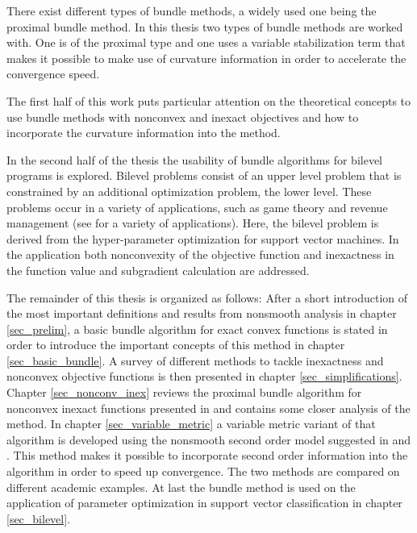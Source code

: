 There exist different types of bundle methods, a widely used one being the proximal bundle method.
In this thesis two types of bundle methods are worked with. One is of the proximal type and one uses a variable stabilization term that makes it possible to make use of curvature information in order to accelerate the convergence speed.

The first half of this work puts particular attention on the theoretical concepts to use bundle methods with nonconvex and inexact objectives and how to incorporate the curvature information into the method.

In the second half of the thesis the usability of bundle algorithms for bilevel programs is explored. Bilevel problems consist of an upper level problem that is constrained by an additional optimization problem, the lower level.
These problems occur in a variety of applications, such as game theory and revenue management (see \cite[section 2.1]{Colson2007} for a variety of applications).
Here, the bilevel problem is derived from the hyper-parameter optimization for support vector machines. 
In the application both nonconvexity of the objective function and inexactness in the function value and subgradient calculation are addressed.

The remainder of this thesis is organized as follows:
After a short introduction of the most important definitions and results from nonsmooth analysis in chapter \ref{sec_prelim}, a basic bundle algorithm for exact convex functions is stated in order to introduce the important concepts of this method in chapter \ref{sec_basic_bundle}. A survey of different methods to tackle inexactness and nonconvex objective functions is then presented in chapter \ref{sec_simplifications}.
Chapter \ref{sec_nonconv_inex} reviews the proximal bundle algorithm for nonconvex inexact functions presented in \cite{Hare2016} and contains some closer analysis of the method. In chapter \ref{sec_variable_metric} a variable metric variant of that algorithm is developed using the nonsmooth second order model suggested in \cite{Noll2012} and \cite{Noll2013}.
This method makes it possible to incorporate second order information into the algorithm in order to speed up convergence.
The two methods are compared on different academic examples.
At last the bundle method is used on the application of parameter optimization in support vector classification in chapter \ref{sec_bilevel}.  

